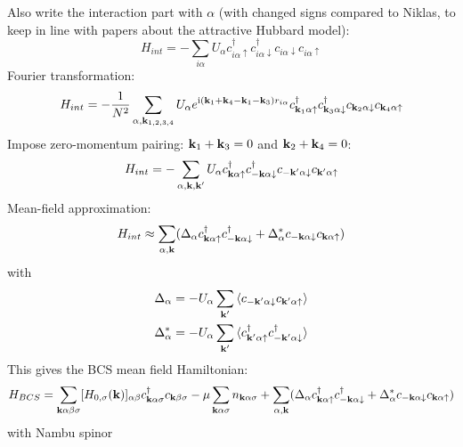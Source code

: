 \documentclass[../main.tex]{subfiles}
\begin{document}
Also write the interaction part with \(\alpha\) (with changed signs compared to Niklas, to keep in line with papers about the attractive Hubbard model):
\begin{equation}
	H_{int} = - \sum_{i \alpha} U_{\alpha} c_{i\alpha \uparrow}^{\dagger} c_{i\alpha \downarrow}^{\dagger} c_{i\alpha \downarrow} c_{i\alpha \uparrow}
\end{equation}
Fourier transformation:
\begin{equation}
	H_{int} = - \frac{1}{N^2} \sum_{\alpha, \bm{\mathrm{k}}_{1, 2, 3, 4}} U_{\alpha} e^{\mathrm{i} (\bm{\mathrm{k}}_1 + \bm{\mathrm{k}}_4 - \bm{\mathrm{k}}_1 - \bm{\mathrm{k}}_3) r_{i \alpha}}  c_{\bm{\mathrm{k}}_1 \alpha \uparrow}^{\dagger} c_{\bm{\mathrm{k}}_3 \alpha \downarrow}^{\dagger} c_{\bm{\mathrm{k}}_2 \alpha \downarrow} c_{\bm{\mathrm{k}}_4 \alpha \uparrow}
\end{equation}
Impose zero-momentum pairing: \(\bm{\mathrm{k}}_1 + \bm{\mathrm{k}}_3 = 0\) and \(\bm{\mathrm{k}}_2 + \bm{\mathrm{k}}_4 = 0\):
\begin{align}
	H_{int} = - \sum_{\alpha, \bm{\mathrm{k}}, \bm{\mathrm{k}}^{\prime}} U_{\alpha} c_{\bm{\mathrm{k}} \alpha \uparrow}^{\dagger} c_{-\bm{\mathrm{k}} \alpha \downarrow}^{\dagger} c_{-\bm{\mathrm{k}}^{\prime} \alpha \downarrow} c_{\bm{\mathrm{k}}^{\prime} \alpha \uparrow}
\end{align}
Mean-field approximation:
\begin{align}
	H_{int} \approx \sum_{\alpha, \bm{\mathrm{k}}} (\Delta_{\alpha} c_{\bm{\mathrm{k}} \alpha \uparrow}^{\dagger} c_{-\bm{\mathrm{k}} \alpha \downarrow}^{\dagger} + \Delta_{\alpha}^* c_{-\bm{\mathrm{k}} \alpha \downarrow} c_{\bm{\mathrm{k}} \alpha \uparrow})
\end{align}
with
\begin{align}
	\Delta_{\alpha} &= - U_{\alpha} \sum_{\bm{\mathrm{k}}^{\prime}} \braket{c_{-\bm{\mathrm{k}}^{\prime} \alpha \downarrow} c_{\bm{\mathrm{k}}^{\prime} \alpha \uparrow}} \\
	\Delta_{\alpha}^* &= - U_{\alpha} \sum_{\bm{\mathrm{k}}^{\prime}} \braket{c_{\bm{\mathrm{k}}^{\prime} \alpha \uparrow}^{\dagger} c_{-\bm{\mathrm{k}}^{\prime} \alpha \downarrow}^{\dagger}}
\end{align}
This gives the BCS mean field Hamiltonian:
\begin{align}
	H_{BCS} = \sum_{\bm{\mathrm{k}} \alpha \beta \sigma} [H_{0, \sigma} (\bm{\mathrm{k}})]_{\alpha \beta} c_{\bm{\mathrm{k}} \alpha \sigma}^{\dagger} c_{\bm{\mathrm{k}} \beta \sigma}
	-\mu \sum_{\bm{\mathrm{k}} \alpha \sigma} n_{\bm{\mathrm{k}} \alpha \sigma}
	+ \sum_{\alpha, \bm{\mathrm{k}}} (\Delta_{\alpha} c_{\bm{\mathrm{k}} \alpha \uparrow}^{\dagger} c_{-\bm{\mathrm{k}} \alpha \downarrow}^{\dagger} + \Delta_{\alpha}^* c_{-\bm{\mathrm{k}} \alpha \downarrow} c_{\bm{\mathrm{k}} \alpha \uparrow})
\end{align}
with Nambu spinor
\end{document}
